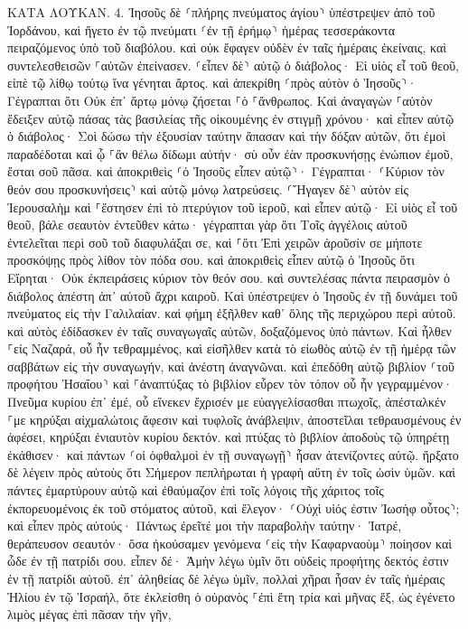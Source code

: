 \documentclass[twoside, 9pt]{extreport}
\begin{document}
ΚΑΤΑ ΛΟΥΚΑΝ.
4.
Ἰησοῦς δὲ ⸂πλήρης πνεύματος ἁγίου⸃ ὑπέστρεψεν ἀπὸ τοῦ Ἰορδάνου, καὶ ἤγετο ἐν τῷ πνεύματι ⸂ἐν τῇ ἐρήμῳ⸃ 
ἡμέρας τεσσεράκοντα πειραζόμενος ὑπὸ τοῦ διαβόλου. καὶ οὐκ ἔφαγεν οὐδὲν ἐν ταῖς ἡμέραις ἐκείναις, καὶ συντελεσθεισῶν ⸀αὐτῶν ἐπείνασεν. 
⸂εἶπεν δὲ⸃ αὐτῷ ὁ διάβολος· Εἰ υἱὸς εἶ τοῦ θεοῦ, εἰπὲ τῷ λίθῳ τούτῳ ἵνα γένηται ἄρτος. 
καὶ ἀπεκρίθη ⸂πρὸς αὐτὸν ὁ Ἰησοῦς⸃· Γέγραπται ὅτι Οὐκ ἐπ᾽ ἄρτῳ μόνῳ ζήσεται ⸀ὁ ⸀ἄνθρωπος. 
Καὶ ἀναγαγὼν ⸀αὐτὸν ἔδειξεν αὐτῷ πάσας τὰς βασιλείας τῆς οἰκουμένης ἐν στιγμῇ χρόνου· 
καὶ εἶπεν αὐτῷ ὁ διάβολος· Σοὶ δώσω τὴν ἐξουσίαν ταύτην ἅπασαν καὶ τὴν δόξαν αὐτῶν, ὅτι ἐμοὶ παραδέδοται καὶ ᾧ ⸀ἂν θέλω δίδωμι αὐτήν· 
σὺ οὖν ἐὰν προσκυνήσῃς ἐνώπιον ἐμοῦ, ἔσται σοῦ πᾶσα. 
καὶ ἀποκριθεὶς ⸂ὁ Ἰησοῦς εἶπεν αὐτῷ⸃· Γέγραπται· ⸂Κύριον τὸν θεόν σου προσκυνήσεις⸃ καὶ αὐτῷ μόνῳ λατρεύσεις. 
⸂Ἤγαγεν δὲ⸃ αὐτὸν εἰς Ἰερουσαλὴμ καὶ ⸀ἔστησεν ἐπὶ τὸ πτερύγιον τοῦ ἱεροῦ, καὶ εἶπεν αὐτῷ· Εἰ υἱὸς εἶ τοῦ θεοῦ, βάλε σεαυτὸν ἐντεῦθεν κάτω· 
γέγραπται γὰρ ὅτι Τοῖς ἀγγέλοις αὐτοῦ ἐντελεῖται περὶ σοῦ τοῦ διαφυλάξαι σε, 
καὶ ⸀ὅτι Ἐπὶ χειρῶν ἀροῦσίν σε μήποτε προσκόψῃς πρὸς λίθον τὸν πόδα σου. 
καὶ ἀποκριθεὶς εἶπεν αὐτῷ ὁ Ἰησοῦς ὅτι Εἴρηται· Οὐκ ἐκπειράσεις κύριον τὸν θεόν σου. 
καὶ συντελέσας πάντα πειρασμὸν ὁ διάβολος ἀπέστη ἀπ᾽ αὐτοῦ ἄχρι καιροῦ. 
Καὶ ὑπέστρεψεν ὁ Ἰησοῦς ἐν τῇ δυνάμει τοῦ πνεύματος εἰς τὴν Γαλιλαίαν. καὶ φήμη ἐξῆλθεν καθ᾽ ὅλης τῆς περιχώρου περὶ αὐτοῦ. 
καὶ αὐτὸς ἐδίδασκεν ἐν ταῖς συναγωγαῖς αὐτῶν, δοξαζόμενος ὑπὸ πάντων. 
Καὶ ἦλθεν ⸀εἰς Ναζαρά, οὗ ἦν τεθραμμένος, καὶ εἰσῆλθεν κατὰ τὸ εἰωθὸς αὐτῷ ἐν τῇ ἡμέρᾳ τῶν σαββάτων εἰς τὴν συναγωγήν, καὶ ἀνέστη ἀναγνῶναι. 
καὶ ἐπεδόθη αὐτῷ βιβλίον ⸂τοῦ προφήτου Ἠσαΐου⸃ καὶ ⸀ἀναπτύξας τὸ βιβλίον εὗρεν τὸν τόπον οὗ ἦν γεγραμμένον· 
Πνεῦμα κυρίου ἐπ᾽ ἐμέ, οὗ εἵνεκεν ἔχρισέν με εὐαγγελίσασθαι πτωχοῖς, ἀπέσταλκέν ⸀με κηρύξαι αἰχμαλώτοις ἄφεσιν καὶ τυφλοῖς ἀνάβλεψιν, ἀποστεῖλαι τεθραυσμένους ἐν ἀφέσει, 
κηρύξαι ἐνιαυτὸν κυρίου δεκτόν. 
καὶ πτύξας τὸ βιβλίον ἀποδοὺς τῷ ὑπηρέτῃ ἐκάθισεν· καὶ πάντων ⸂οἱ ὀφθαλμοὶ ἐν τῇ συναγωγῇ⸃ ἦσαν ἀτενίζοντες αὐτῷ. 
ἤρξατο δὲ λέγειν πρὸς αὐτοὺς ὅτι Σήμερον πεπλήρωται ἡ γραφὴ αὕτη ἐν τοῖς ὠσὶν ὑμῶν. 
καὶ πάντες ἐμαρτύρουν αὐτῷ καὶ ἐθαύμαζον ἐπὶ τοῖς λόγοις τῆς χάριτος τοῖς ἐκπορευομένοις ἐκ τοῦ στόματος αὐτοῦ, καὶ ἔλεγον· ⸂Οὐχὶ υἱός ἐστιν Ἰωσὴφ οὗτος⸃; 
καὶ εἶπεν πρὸς αὐτούς· Πάντως ἐρεῖτέ μοι τὴν παραβολὴν ταύτην· Ἰατρέ, θεράπευσον σεαυτόν· ὅσα ἠκούσαμεν γενόμενα ⸂εἰς τὴν Καφαρναοὺμ⸃ ποίησον καὶ ὧδε ἐν τῇ πατρίδι σου. 
εἶπεν δέ· Ἀμὴν λέγω ὑμῖν ὅτι οὐδεὶς προφήτης δεκτός ἐστιν ἐν τῇ πατρίδι αὐτοῦ. 
ἐπ᾽ ἀληθείας δὲ λέγω ὑμῖν, πολλαὶ χῆραι ἦσαν ἐν ταῖς ἡμέραις Ἠλίου ἐν τῷ Ἰσραήλ, ὅτε ἐκλείσθη ὁ οὐρανὸς ⸀ἐπὶ ἔτη τρία καὶ μῆνας ἕξ, ὡς ἐγένετο λιμὸς μέγας ἐπὶ πᾶσαν τὴν γῆν, 
\end{document}
